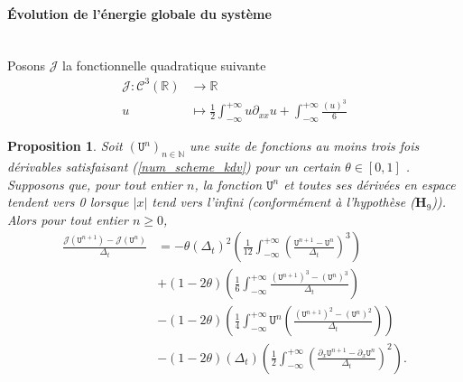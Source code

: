 \documentclass[12pt,a4paper]{article}
\newtheorem{prop}[dfn]{\textbf{Proposition}}
\numberwithin{equation}{section}
\begin{document}
\paragraph{Évolution de l'énergie globale du système}\,\\
Posons $\mathcal{J}$ la fonctionnelle quadratique suivante 
\begin{align*}
        \mathcal{J} : \mathcal{C}^3(\mathbb{R}) &\longrightarrow \mathbb{R}\\
        u &\mapsto \frac{1}{2}\int_{-\infty}^{+\infty} u\partial_{xx}u  +  \int_{-\infty}^{+\infty}\frac{(u)^3}{6}
\end{align*}
\begin{prop}
Soit $(\texttt{U}^n)_{n  \in \mathbb{N}}$ une suite de fonctions au moins trois fois dérivables satisfaisant (\ref{num_scheme_kdv}) pour un certain $\theta\in[0,1]$ . Supposons que, pour tout entier $n$, la fonction $\texttt{U}^n$ et toutes ses dérivées en espace tendent vers 0 lorsque $|x|$ tend vers l'infini (conformément à l'hypothèse ($\textbf{H}_9$)). Alors pour tout entier $n \geq 0$,
    \begin{equation*}
\begin{aligned}
    \frac{\mathcal{J}(\texttt{U}^{n+1})- \mathcal{J}(\texttt{U}^{n})}{\Delta_t} &= - \theta (\Delta_t)^2 \left(\frac{1}{12}\int_{-\infty}^{+\infty}\left(\frac{\texttt{U}^{n+1} - \texttt{U}^n}{\Delta_t}\right)^3\right)\\
    &+ (1-2\theta)\left(\frac{1}{6}\int_{-\infty}^{+\infty} \frac{(\texttt{U}^{n+1})^3-(\texttt{U}^n)^3}{\Delta_t}  \right) \\
    &- (1-2\theta)\left(\frac{1}{4}\int_{-\infty}^{+\infty}\texttt{U}^n \left(\frac{(\texttt{U}^{n+1})^2-(\texttt{U}^n)^2}{\Delta_t}\right) \right) \\
    &- (1-2\theta)(\Delta_t)\left(\frac{1}{2}\int_{-\infty}^{+\infty}\left(\frac{\partial_{x}\texttt{U}^{n+1}-\partial_{x}\texttt{U}^n}{\Delta_t}\right)^2 \right).
\end{aligned}
\end{equation*}
\end{prop}
\end{document}
